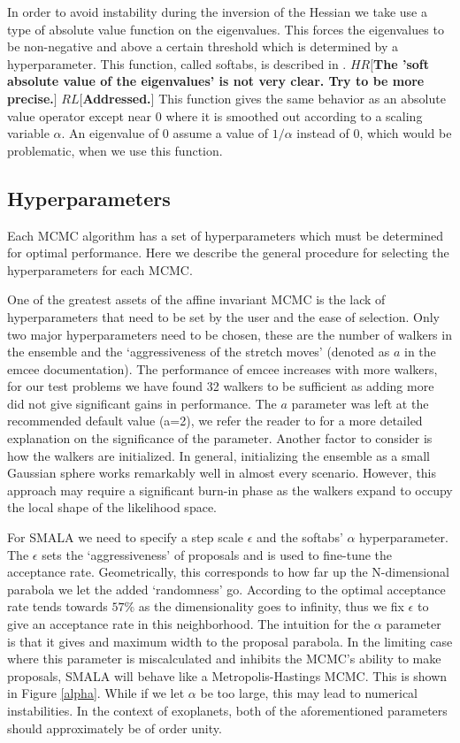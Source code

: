 \documentclass{aa}
\def\memohr#1{\color{blue}$HR[${\bf #1}$]$ \color{black}}
\def\memorl#1{\color{gray}$RL[${\bf #1}$]$ \color{black}}
\begin{document}
In order to avoid instability during the inversion of the Hessian we take use a type of absolute value function on the eigenvalues. 
This forces the eigenvalues to be non-negative and above a certain threshold which is determined by a hyperparameter.
This function, called softabs, is described in \cite{softabs}.
\memohr{The 'soft absolute value of the eigenvalues' is not very clear. Try to be more precise.} 
\memorl{Addressed.}
This function gives the same behavior as an absolute value operator except near $0$ where it is smoothed out according to a scaling variable $\alpha$.
An eigenvalue of $0$ assume a value of $1/\alpha$ instead of $0$, which would be problematic, when we use this function.

\subsection{Hyperparameters}\label{hyper}
Each MCMC algorithm has a set of hyperparameters which must be determined for optimal performance. Here we describe the general procedure for selecting the hyperparameters for each MCMC.

One of the greatest assets of the affine invariant MCMC is the lack of hyperparameters that need to be set by the user and the ease of selection. 
Only two major hyperparameters need to be chosen, these are the number of walkers in the ensemble and the `aggressiveness of the stretch moves' (denoted as $a$ in the emcee documentation). 
The performance of emcee increases with more walkers, for our test problems we have found 32 walkers to be sufficient as adding more did not give significant gains in performance. 
The $a$ parameter was left at the recommended default value (a=2), we refer the reader to \cite{Foreman-Mackey2013} for a more detailed explanation on the significance of the parameter. 
Another factor to consider is how the walkers are initialized. In general, initializing the ensemble as a small Gaussian sphere works remarkably well in almost every scenario. 
However, this approach may require a significant burn-in phase as the walkers expand to occupy the local shape of the likelihood space.

For SMALA we need to specify a step scale $\epsilon$ and the softabs' $\alpha$ hyperparameter. 
The $\epsilon$ sets the `aggressiveness' of proposals and is used to fine-tune the acceptance rate. 
Geometrically, this corresponds to how far up the N-dimensional parabola we let the added `randomness' go. 
According to \cite{robert1998} the optimal acceptance rate tends towards $57\%$ as the dimensionality goes to infinity, thus we fix $\epsilon$ to give an acceptance rate in this neighborhood. 
The intuition for the $\alpha$ parameter is that it gives and maximum width to the proposal parabola. 
In the limiting case where this parameter is miscalculated and inhibits the MCMC's ability to make proposals, SMALA will behave like a Metropolis-Hastings MCMC. 
This is shown in Figure \ref{alpha}. 
While if we let $\alpha$ be too large, this may lead to numerical instabilities. 
In the context of exoplanets, both of the aforementioned parameters should approximately be of order unity.
\end{document}

